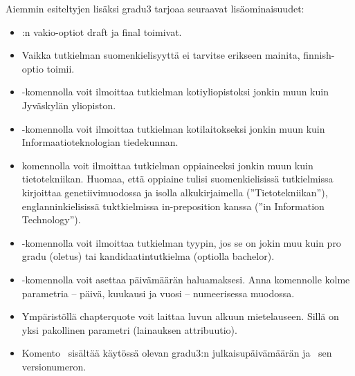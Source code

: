 \documentclass[utf8]{gradu3-tjt}
\begin{document}
Aiemmin esiteltyjen lisäksi gradu3 tarjoaa seuraavat lisäominaisuudet:
\begin{itemize}
\item \LaTeXe:n vakio-optiot draft ja final toimivat.
\item Vaikka tutkielman suomenkielisyyttä ei tarvitse erikseen
  mainita, finnish-optio toimii.
\item \string\university-komennolla voit ilmoittaa tutkielman
  kotiyliopistoksi jonkin muun kuin Jyväskylän yliopiston.
\item  \string\department-komennolla voit ilmoittaa tutkielman
  kotilaitokseksi jonkin muun kuin Informaatioteknologian tiedekunnan.
\item \string\subject-komennolla voit ilmoittaa tutkielman
  oppiaineeksi jonkin muun kuin tietotekniikan.  Huomaa, että oppiaine
  tulisi suomenkielisissä tutkielmissa kirjoittaa genetiivimuodossa ja
  isolla alkukirjaimella (''Tietotekniikan''), englanninkielisissä
  tuktkielmissa in-preposition kanssa (''in Information Technology'').
\item \string\type-komennolla voit ilmoittaa tutkielman tyypin, jos se
  on jokin muu kuin pro gradu (oletus) tai kandidaatintutkielma
  (optiolla bachelor).
\item \string\setdate-komennolla voit asettaa päivämäärän
  haluamaksesi.  Anna komennolle kolme parametria -- päivä,
  kuukausi ja vuosi -- numeerisessa muodossa.
\item Ympäristöllä chapterquote voit laittaa luvun alkuun
  mietelauseen.  Sillä on yksi pakollinen parametri (lainauksen
  attribuutio).
\item Komento \string\graduclsdate\ sisältää käytössä olevan gradu3:n
  julkaisupäivämäärän ja \string\graduclsversion\ sen versionumeron.
\end{itemize}
\end{document}
